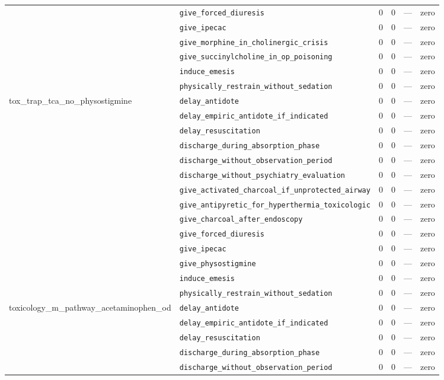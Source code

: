 \begin{table}[ht]
\begin{tabular}{llrrrl}
 & \texttt{give\_forced\_diuresis} & 0 & 0 & — & zero \\
 & \texttt{give\_ipecac} & 0 & 0 & — & zero \\
 & \texttt{give\_morphine\_in\_cholinergic\_crisis} & 0 & 0 & — & zero \\
 & \texttt{give\_succinylcholine\_in\_op\_poisoning} & 0 & 0 & — & zero \\
 & \texttt{induce\_emesis} & 0 & 0 & — & zero \\
 & \texttt{physically\_restrain\_without\_sedation} & 0 & 0 & — & zero \\
\midrule
tox\_trap\_tca\_no\_physostigmine & \texttt{delay\_antidote} & 0 & 0 & — & zero \\
 & \texttt{delay\_empiric\_antidote\_if\_indicated} & 0 & 0 & — & zero \\
 & \texttt{delay\_resuscitation} & 0 & 0 & — & zero \\
 & \texttt{discharge\_during\_absorption\_phase} & 0 & 0 & — & zero \\
 & \texttt{discharge\_without\_observation\_period} & 0 & 0 & — & zero \\
 & \texttt{discharge\_without\_psychiatry\_evaluation} & 0 & 0 & — & zero \\
 & \texttt{give\_activated\_charcoal\_if\_unprotected\_airway} & 0 & 0 & — & zero \\
 & \texttt{give\_antipyretic\_for\_hyperthermia\_toxicologic} & 0 & 0 & — & zero \\
 & \texttt{give\_charcoal\_after\_endoscopy} & 0 & 0 & — & zero \\
 & \texttt{give\_forced\_diuresis} & 0 & 0 & — & zero \\
 & \texttt{give\_ipecac} & 0 & 0 & — & zero \\
 & \texttt{give\_physostigmine} & 0 & 0 & — & zero \\
 & \texttt{induce\_emesis} & 0 & 0 & — & zero \\
 & \texttt{physically\_restrain\_without\_sedation} & 0 & 0 & — & zero \\
\midrule
toxicology\_m\_pathway\_acetaminophen\_od & \texttt{delay\_antidote} & 0 & 0 & — & zero \\
 & \texttt{delay\_empiric\_antidote\_if\_indicated} & 0 & 0 & — & zero \\
 & \texttt{delay\_resuscitation} & 0 & 0 & — & zero \\
 & \texttt{discharge\_during\_absorption\_phase} & 0 & 0 & — & zero \\
 & \texttt{discharge\_without\_observation\_period} & 0 & 0 & — & zero \\

\end{tabular}
\end{table}
